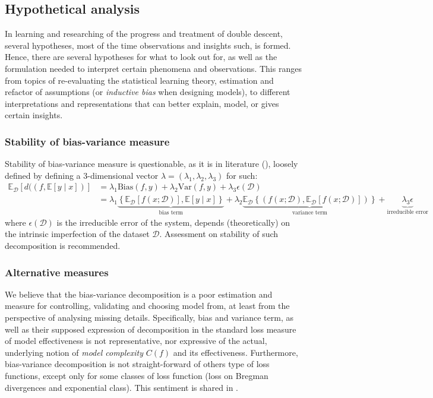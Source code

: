\documentclass[twoside,10pt]{article}
\begin{document}
\subsection{Hypothetical analysis}
In learning and researching of the progress and treatment of double descent, several hypotheses, most of the time observations and insights such, is formed. Hence, there are several hypotheses for what to look out for, as well as the formulation needed to interpret certain phenomena and observations. This ranges from topics of re-evaluating the statistical learning theory, estimation and refactor of assumptions (or \textit{inductive bias} when designing models), to different interpretations and representations that can better explain, model, or gives certain insights.  
\subsubsection{Stability of bias-variance measure}
Stability of bias-variance measure is questionable, as it is in literature (\cite{domingos_unifeid_2000}), loosely defined by defining a 3-dimensional vector $\lambda=(\lambda_{1},\lambda_{2},\lambda_{3})$ for such: 
\noindent 
\begin{equation*}
        \begin{split}
            \mathbb{E}_{\mathcal{D}} \left[d((f,\mathbb{E}[y\mid x])\right] & = \lambda_{1} \mathrm{Bias}(f,y) + \lambda_{2}\mathrm{Var}(f,y)+ \lambda_{3}\epsilon(\mathcal{D})\\ 
            & = \lambda_{1}\underbrace{\left\{ \mathbb{E}_{\mathcal{D}}[f(x;\mathcal{D})] , \mathbb{E}[y\mid x] \right\}}_{\text{bias term}} +\lambda_{2} \underbrace{\mathbb{E}_{\mathcal{D}} \left\{(f(x;\mathcal{D}), \mathbb{E}_{\mathcal{D}}[f(x;\mathcal{D})])\right\}}_{\text{variance term}} +\underbrace{\lambda_{3}\epsilon}_{\text{irreducible error}}
        \end{split}
\end{equation*}
where $\epsilon(\mathcal{D})$ is the irreducible error of the system, depends (theoretically) on the intrinsic imperfection of the dataset $\mathcal{D}$. Assessment on stability of such decomposition is recommended. 
\subsubsection{Alternative measures}
We believe that the bias-variance decomposition is a poor estimation and measure for controlling, validating and choosing model from, at least from the perspective of analysing missing details. Specifically, bias and variance term, as well as their supposed expression of decomposition in the standard loss measure of model effectiveness is not representative, nor expressive of the actual, underlying notion of \textit{model complexity} $C(f)$ and its effectiveness. Furthermore, bias-variance decomposition is not straight-forward of others type of loss functions, except only for some classes of loss function (loss on Bregman divergences and exponential class). This sentiment is shared in \cite{brown2024biasvariance}.
\end{document}
